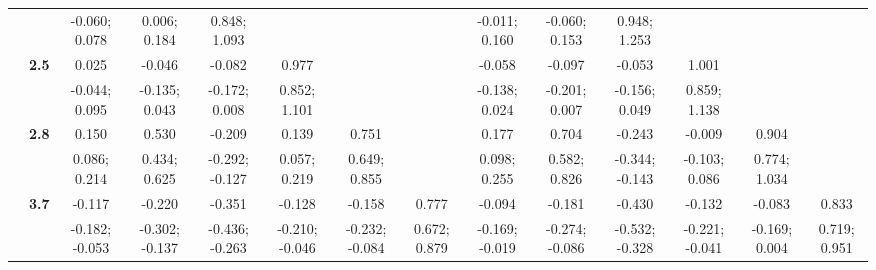 \begin{landscape}
\begin{table}[!htp]
\begin{center}
\begin{tabular}{>{\bfseries}c>{\bfseries}ccccccccccccc}
 &  & -0.060; 0.078 & 0.006; 0.184 & 0.848; 1.093 &  &  &  & -0.011; 0.160 & -0.060; 0.153 & 0.948; 1.253 &  &  & \\[0.7ex]
 & 2.5 & 0.025 & -0.046 & -0.082 & 0.977 &  &  & -0.058 & -0.097 & -0.053 & 1.001 &  & \\
 &  & -0.044; 0.095 & -0.135; 0.043 & -0.172; 0.008 & 0.852; 1.101 &  &  & -0.138; 0.024 & -0.201; 0.007 & -0.156; 0.049 & 0.859; 1.138 &  & \\[0.7ex]
 & 2.8 & 0.150 & 0.530 & -0.209 & 0.139 & 0.751 &  & 0.177 & 0.704 & -0.243 & -0.009 & 0.904 & \\
 &  & 0.086; 0.214 & 0.434; 0.625 & -0.292; -0.127 & 0.057; 0.219 & 0.649; 0.855 &  & 0.098; 0.255 & 0.582; 0.826 & -0.344; -0.143 & -0.103; 0.086 & 0.774; 1.034 & \\[0.7ex]
 & 3.7 & -0.117 & -0.220 & -0.351 & -0.128 & -0.158 & 0.777 & -0.094 & -0.181 & -0.430 & -0.132 & -0.083 & 0.833\\
 &  & -0.182; -0.053 & -0.302; -0.137 & -0.436; -0.263 & -0.210; -0.046 & -0.232; -0.084 & 0.672; 0.879 & -0.169; -0.019 & -0.274; -0.086 & -0.532; -0.328 & -0.221; -0.041 & -0.169; 0.004 & 0.719; 0.951\\
\bottomrule
\end{tabular}
\end{center}
\end{table}
\end{landscape}
 \newpage

